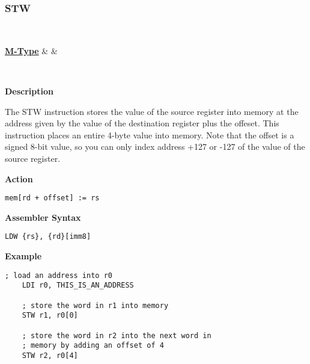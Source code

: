 \subsubsection{STW }\label{sec:STW}

\vspace{3ex}

\begin{center}
	\begin{bytefield}[leftcurly=., leftcurlyspace=0pt]{32}
		 \\
		\begin{leftwordgroup}{\hyperref[sec:m-type]{\textbf{M-Type}}}
		 & 
		 &
		\end{leftwordgroup}\\
	\end{bytefield}
\end{center}

\textbf{Description}

The STW instruction stores the value of the source register into memory at the address given by the value of the destination register plus the offeset.
This instruction places an entire 4-byte value into memory.
Note that the offset is a signed 8-bit value, so you can only index address +127 or -127 of the value of the source register.

\vspace{3ex}

\textbf{Action}
\begin{lstlisting}[frame=single]
	mem[rd + offset] := rs
\end{lstlisting}

\vspace{3ex}

\textbf{Assembler Syntax}
\begin{lstlisting}[frame=single]
	LDW {rs}, {rd}[imm8]
\end{lstlisting}

\vspace{3ex}

\textbf{Example}
\begin{lstlisting}[frame=single]
	; load an address into r0
	LDI r0, THIS_IS_AN_ADDRESS
	
	; store the word in r1 into memory
	STW r1, r0[0]
	
	; store the word in r2 into the next word in
	; memory by adding an offset of 4
	STW r2, r0[4]
\end{lstlisting}

